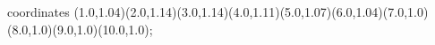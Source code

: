 					coordinates { (1.0,1.04)(2.0,1.14)(3.0,1.14)(4.0,1.11)(5.0,1.07)(6.0,1.04)(7.0,1.0)(8.0,1.0)(9.0,1.0)(10.0,1.0)};
